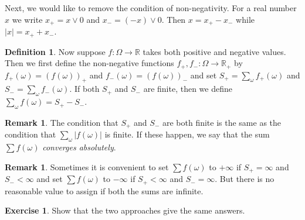 \documentclass[preprint,  11pt]{amsart}
\theoremstyle{plain} %
\theoremstyle{definition} %
\newtheorem{definition}[theorem]{Definition}
\newtheorem{exercise}[theorem]{Exercise}
\newtheorem{remark}[theorem]{Remark}
\begin{document}
Next, we would like to remove the condition of non-negativity. For a real number $x$ we write $x_{+}=x\vee 0$ and $x_{-}=(-x)\vee 0$. Then $x=x_{+}-x_{-}$ while $|x|=x_{+}+x_{-}$.  
\begin{definition} Now suppose $f:\Omega\rightarrow \mathbb{R}$ takes both positive and negative values. Then we first define the non-negative functions $f_{+},f_{-}:\Omega\rightarrow \mathbb{R}_{+}$ by $f_{+}(\omega)=(f(\omega))_{+}$ and $f_{-}(\omega)=(f(\omega))_{-}$ and set $S_{+}=\sum_{\omega}f_{+}(\omega)$ and $S_{-}=\sum_{\omega}f_{-}(\omega)$. If both $S_{+}$ and $S_{-}$ are finite, then we define $\sum_{\omega}f(\omega)= S_{+}-S_{-}$. 
\end{definition}
\begin{remark} The condition that $S_{+}$ and $S_{-}$ are both finite is the same as the condition that $\sum_{\omega}|f(\omega)|$ is finite. If these happen,  we say that the sum $\sum f(\omega)$ {\em converges absolutely}.
\end{remark}
\begin{remark} Sometimes it is convenient to set $\sum f(\omega)$ to $+\infty$ if  $S_{+}=\infty$ and $S_{-}<\infty$ and set $\sum f(\omega)$ to $-\infty$ if $S_{+}<\infty$ and $S_{-}=\infty$. But there is no reasonable value to assign if both the sums are infinite. 
\end{remark}

\begin{exercise} Show that the two approaches give the same answers.
\end{exercise}


\end{document}
